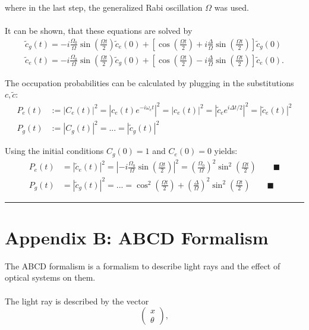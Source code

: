 \documentclass{article}
\newcommand{\lr}[1]{\left(#1\right)}
\newcommand{\lreck}[1]{\left[#1\right]}
\begin{document}
{	where in the last step, the generalized Rabi oscillation $\Omega$ was used.\\
	\\
	It can be shown, that these equations are solved by
		\begin{align*}
			\tilde{c}_g(t) = -i\frac{\Omega_0}{\Omega} \sin\lr{ \frac{\Omega t}{2} } \tilde{c}_e(0) + \lreck{ \cos\lr{ \frac{\Omega t}{2} } + i \frac{\Delta}{\Omega} \sin\lr{ \frac{\Omega t}{2} } } \tilde{c}_g(0) \\
			\tilde{c}_e(t) = -i\frac{\Omega_0}{\Omega} \sin\lr{ \frac{\Omega t}{2} } \tilde{c}_g(0) + \lreck{ \cos\lr{ \frac{\Omega t}{2} } - i \frac{\Delta}{\Omega} \sin\lr{ \frac{\Omega t}{2} } } \tilde{c}_e(0).
		\end{align*}

	The occupation probabilities can be calculated by plugging in the substitutions $c, \tilde{c}$:
		\begin{align*}
			P_e(t) &:= |C_e(t)|^2 = |c_e(t) e^{-i\omega_e t}|^2 = |c_e(t)|^2 = |\tilde{c}_e e^{i\Delta t/2}|^2 = |\tilde{c}_e(t)|^2 \\
			P_g(t) &:= |C_g(t)|^2 = ... = |\tilde{c}_g(t)|^2
		\end{align*}

	Using the initial conditions $C_g(0)=1$ and $C_e(0)=0$ yields:
		\begin{align*}
			P_e(t) &= |\tilde{c}_e(t)|^2 = \left|-i\frac{\Omega_0}{\Omega} \sin\lr{ \frac{\Omega t}{2} } \right|^2 = \lr{ \frac{\Omega_0}{\Omega} }^2 \sin^2 \lr{ \frac{\Omega t}{2} } \qquad \blacksquare \\
			P_g(t) &= |\tilde{c}_g(t)|^2 = ... = \cos^2\lr{ \frac{\Omega t}{2} } + \lr{ \frac{\Delta}{\Omega} }^2 \sin^2\lr{ \frac{\Omega t}{2} } \qquad \blacksquare
		\end{align*}
\hrule
}


\newpage


\section*{Appendix B: ABCD Formalism}
The ABCD formalism is a formalism to describe light rays and the effect of optical systems on them.\\
\\
The light ray is described by the vector
	\begin{equation}
		\begin{pmatrix}
			x \\ \theta
		\end{pmatrix},
	\end{equation}
\end{document}
